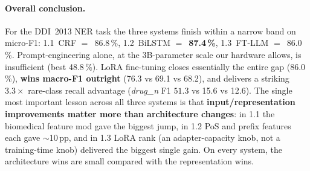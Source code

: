 \documentclass[a4paper,12pt]{article}
\begin{document}
\paragraph{Overall conclusion.}
For the DDI~2013 NER task the three systems finish within a narrow
band on micro-F1: 1.1~CRF $=$~86.8\,\%, 1.2~BiLSTM
$=$~\textbf{87.4\,\%}, 1.3~FT-LLM $=$~86.0\,\%. Prompt-engineering
alone, at the 3B-parameter scale our hardware allows, is insufficient
(best 48.8\,\%). LoRA fine-tuning closes essentially the entire gap
(86.0\,\%), \textbf{wins macro-F1 outright} (76.3 vs 69.1 vs 68.2),
and delivers a striking $\mathbf{3.3\times}$ rare-class recall
advantage (\textit{drug\_n} F1 $51.3$ vs 15.6 vs 12.6). The single
most important lesson across all three systems is that
\textbf{input/representation improvements matter more than
architecture changes}: in 1.1 the biomedical feature mod gave the
biggest jump, in 1.2 PoS and prefix features each gave $\sim$10\,pp,
and in 1.3 LoRA rank (an adapter-capacity knob, not a training-time
knob) delivered the biggest single gain. On every system, the
architecture wins are small compared with the representation wins.
\end{document}
